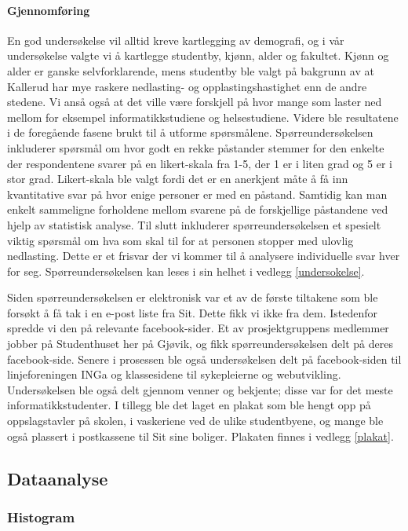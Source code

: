 \paragraph{Gjennomføring}
En god undersøkelse vil alltid kreve kartlegging av demografi, og i vår undersøkelse valgte vi å kartlegge studentby, kjønn, alder og fakultet. Kjønn og alder er ganske selvforklarende, mens studentby ble valgt på bakgrunn av at Kallerud har mye raskere nedlasting- og opplastingshastighet enn de andre stedene. Vi anså også at det ville være forskjell på hvor mange som laster ned mellom for eksempel informatikkstudiene og helsestudiene. Videre ble resultatene i de foregående fasene brukt til å utforme spørsmålene. Spørreundersøkelsen inkluderer spørsmål om hvor godt en rekke påstander stemmer for den enkelte der respondentene svarer på en likert-skala fra 1-5, der 1 er i liten grad og 5 er i stor grad. Likert-skala ble valgt fordi det er en anerkjent måte å få inn kvantitative svar på hvor enige personer er med en påstand. Samtidig kan man enkelt sammeligne forholdene mellom svarene på de forskjellige påstandene ved hjelp av statistisk analyse. Til slutt inkluderer spørreundersøkelsen et spesielt viktig spørsmål om hva som skal til for at personen stopper med ulovlig nedlasting. Dette er et frisvar der vi kommer til å analysere individuelle svar hver for seg. Spørreundersøkelsen kan leses i sin helhet i vedlegg \ref{undersokelse}.
\newline

Siden spørreundersøkelsen er elektronisk var et av de første tiltakene som ble forsøkt å få tak i en e-post liste fra Sit. Dette fikk vi ikke fra dem. Istedenfor spredde vi den på relevante facebook-sider. Et av prosjektgruppens medlemmer jobber på Studenthuset her på Gjøvik, og fikk spørreundersøkelsen delt på deres facebook-side. Senere i prosessen ble også undersøkelsen delt på facebook-siden til linjeforeningen INGa og klassesidene til sykepleierne og webutvikling. Undersøkelsen ble også delt gjennom venner og bekjente; disse var for det meste informatikkstudenter. I tillegg ble det laget en plakat som ble hengt opp på oppslagstavler på skolen, i vaskeriene ved de ulike studentbyene, og mange ble også plassert i postkassene til Sit sine boliger. Plakaten finnes i vedlegg \ref{plakat}.


\subsection{Dataanalyse}

\subsubsection{Histogram}

